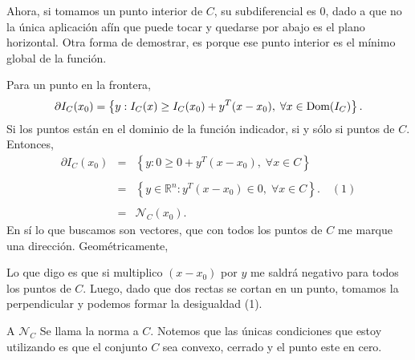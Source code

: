 \begin{paracol}{2}
Ahora, si tomamos un punto interior de $C$, su subdiferencial es $0$, dado a que no la única aplicación afín que puede tocar y quedarse por abajo es el plano horizontal. Otra forma de demostrar, es porque ese punto interior es el mínimo global de la función.

Para un punto en la frontera, 
$$\partial I_C(x_0)=\left\{y:I_C(x)\geq I_C(x_0)+y^T(x-x_0),\; \forall x\in \mathop{\mbox{\normalfont Dom}}\nolimits(I_C)\right\}.$$
Si los puntos están en el dominio de la función indicador, si y sólo si puntos de $C$. Entonces,
$$
\begin{array}{rcl}
    \partial I_C(x_0)&=&\left\{y:0\geq 0+y^T(x-x_0),\; \forall x\in C\right\}\\\\
		     &=&\left\{y\in \mathbb{R}^n: y^T(x-x_0)\in 0, \; \forall x\in C\right\}. \quad (1)\\\\
		     &=&\mathcal{N}_C(x_0).
\end{array}
$$
En sí lo que buscamos son vectores, que con todos los puntos de $C$ me marque una dirección. Geométricamente,
\begin{center}
\end{center}
Lo que digo es que si multiplico $(x-x_0)$ por $y$ me saldrá negativo para todos los puntos de $C$. Luego, dado que dos rectas se cortan en un punto, tomamos la perpendicular y podemos formar la desigualdad (1).
\begin{center}
\end{center}
A $\mathcal{N}_C$ Se llama la norma a $C$. Notemos que las únicas condiciones que estoy utilizando es que el conjunto $C$ sea convexo, cerrado y el punto este en cero.




\end{paracol}
